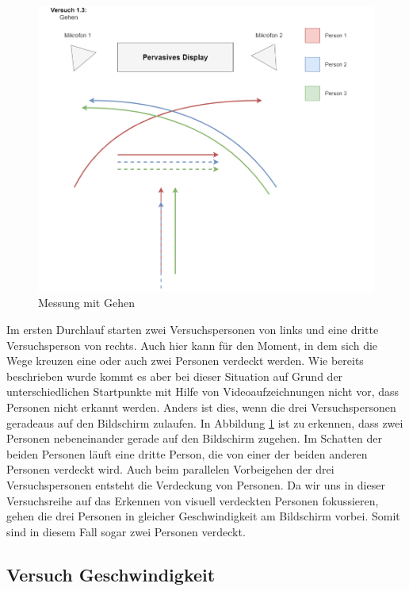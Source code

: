 \begin{figure}[H]
	\begin{center}
		\includegraphics[width=\textwidth]{images/Versuch 1.3.PNG}
		\caption{Messung mit Gehen}
	\label{versuch1.3}
	\end{center}
\end{figure}

Im ersten Durchlauf starten zwei Versuchspersonen von links und eine dritte Versuchsperson von rechts. Auch hier kann für den Moment, in dem sich die Wege kreuzen eine oder auch zwei Personen verdeckt werden. Wie bereits beschrieben wurde kommt es aber bei dieser Situation auf Grund der unterschiedlichen Startpunkte mit Hilfe von Videoaufzeichnungen nicht vor, dass Personen nicht erkannt werden. Anders ist dies, wenn die drei Versuchspersonen geradeaus auf den Bildschirm zulaufen. In Abbildung \ref{versuch1.3} ist zu erkennen, dass zwei Personen nebeneinander gerade auf den Bildschirm zugehen. Im Schatten der beiden Personen läuft eine dritte Person, die von einer der beiden anderen Personen verdeckt wird. Auch beim parallelen Vorbeigehen der drei Versuchspersonen entsteht die Verdeckung von Personen. Da wir uns in dieser Versuchsreihe auf das Erkennen von visuell verdeckten Personen fokussieren, gehen die drei Personen in gleicher Geschwindigkeit am Bildschirm vorbei. Somit sind in diesem Fall sogar zwei Personen verdeckt. 

\subsection{Versuch Geschwindigkeit}

